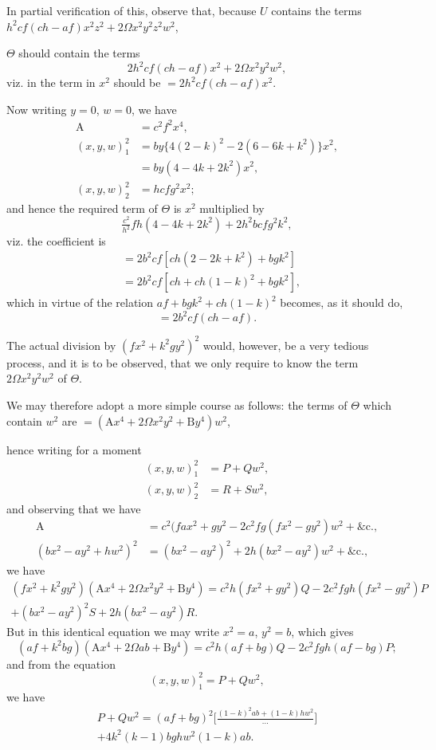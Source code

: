\documentclass[11pt,a4paper]{book}
\begin{document}
In partial verification of this, observe that, because $U$ contains the terms $h^{2}cf(ch-af)x^{2}z^{2} + 2\Omega x^{2}y^{2}z^{2}w^{2}$,

\newpage
\setcounter{page}{108}

$\Theta$ should contain the terms
\[
2h^{2}cf(ch-af)x^{2} + 2\Omega x^{2}y^{2}w^{2},
\]
viz. in the term in $x^{2}$ should be $= 2h^{2}cf(ch-af)x^{2}$.

Now writing $y=0$, $w=0$, we have
\begin{align*}
\text{A} &= c^{2}f^{2}x^{4}, \\
(x, y, w)_{1}^{2} &= by\{4(2-k)^{2} - 2(6-6k+k^{2})\}x^{2}, \\
&= by(4 - 4k + 2k^{2})x^{2}, \\
(x, y, w)_{2}^{2} &= hcfg^{2}x^{2};
\end{align*}
and hence the required term of $\Theta$ is $x^{2}$ multiplied by
\[
\tfrac{c^{2}}{h^{2}}fh(4 - 4k + 2k^{2}) + 2h^{2}bcfg^{2}k^{2},
\]
viz. the coefficient is
\begin{align*}
&= 2b^{2}cf[ch(2-2k+k^{2}) + bgk^{2}] \\
&= 2b^{2}cf[ch + ch(1-k)^{2} + bgk^{2}],
\end{align*}
which in virtue of the relation $af + bgk^{2} + ch(1-k)^{2}$ becomes, as it should do,
\[
= 2b^{2}cf(ch-af).
\]

The actual division by $(fx^{2} + k^{2}gy^{2})^{2}$ would, however, be a very tedious process, and it is to be observed, that we only require to know the term $2\Omega x^{2}y^{2}w^{2}$ of $\Theta$.

We may therefore adopt a more simple course as follows: the terms of $\Theta$ which contain $w^{2}$ are $= (\text{A}x^{4} + 2\Omega x^{2}y^{2} + \text{B}y^{4})w^{2}$,

hence writing for a moment
\begin{align*}
(x, y, w)_{1}^{2} &= P + Qw^{2}, \\
(x, y, w)_{2}^{2} &= R + Sw^{2},
\end{align*}
and observing that we have
\begin{align*}
\text{A} &= c^{2}(fax^{2} + gy^{2} - 2c^{2}fg(fx^{2} - gy^{2})w^{2} + \&\text{c.}, \\
(bx^{2} - ay^{2} + hw^{2})^{2} &= (bx^{2} - ay^{2})^{2} + 2h(bx^{2} - ay^{2})w^{2} + \&\text{c.},
\end{align*}
we have
%
\begin{multline}
(fx^{2} + k^{2}gy^{2})(\text{A}x^{4} + 2\Omega x^{2}y^{2} + \text{B}y^{4}) = c^{2}h(fx^{2} + gy^{2})Q - 2c^{2}fgh(fx^{2} - gy^{2})P \\
+ (bx^{2} - ay^{2})^{2}S + 2h(bx^{2} - ay^{2})R.
\end{multline}
%
But in this identical equation we may write $x^{2}=a$, $y^{2}=b$, which gives
\[
(af + k^{2}bg)(\text{A}x^{4} + 2\Omega ab + \text{B}y^{4}) = c^{2}h(af + bg)Q - 2c^{2}fgh(af - bg)P;
\]
and from the equation
\[
(x, y, w)_{1}^{2} = P + Qw^{2},
\]
we have
%
\begin{multline}
P + Qw^{2} = (af + bg)^{2}\biggl[\frac{(1-k)^{2}ab + (1-k)hw^{2}}{\cdots}\biggr] \\
+ 4k^{2}(k-1)bghw^{2}(1-k)ab.
\end{multline}
\end{document}
